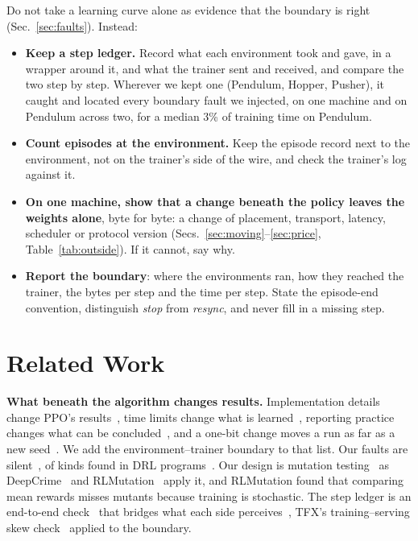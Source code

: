\documentclass[conference]{IEEEtran}
\begin{document}
Do not take a learning curve alone as evidence that the boundary is right
(Sec.~\ref{sec:faults}). Instead:
\begin{itemize}
\item \textbf{Keep a step ledger.} Record what each environment took and
  gave, in a wrapper around it, and what the trainer sent and received, and
  compare the two step by step. Wherever we kept one (Pendulum, Hopper,
  Pusher), it caught and located every boundary fault we injected, on one
  machine and on Pendulum across two, for a median 3\% of training time on
  Pendulum.
\item \textbf{Count episodes at the environment.} Keep the episode record
  next to the environment, not on the trainer's side of the wire, and check
  the trainer's log against it.
\item \textbf{On one machine, show that a change beneath the policy leaves
  the weights alone}, byte for byte: a change of placement, transport,
  latency, scheduler or protocol version
  (Secs.~\ref{sec:moving}--\ref{sec:price}, Table~\ref{tab:outside}). If it
  cannot, say why.
\item \textbf{Report the boundary}: where the environments ran, how they
  reached the trainer, the bytes per step and the time per step. State the
  episode-end convention, distinguish \emph{stop} from \emph{resync}, and
  never fill in a missing step.
\end{itemize}

\section{Related Work}

\textbf{What beneath the algorithm changes results.} Implementation details
change PPO's results~\cite{engstrom2020implementation,huang2022details},
time limits change what is learned~\cite{pardo2018time}, reporting
practice changes what can be
concluded~\cite{henderson2018matters,agarwal2021precipice}, and a one-bit
change moves a run as far as a new seed~\cite{summers2021nondeterminism}.
We add the environment--trainer boundary to that list. Our faults are
silent~\cite{tambon2024silent}, of kinds found in DRL
programs~\cite{nikanjam2022faults}. Our design is mutation
testing~\cite{demillo1978hints} as DeepCrime~\cite{humbatova2021deepcrime}
and RLMutation~\cite{tambon2023rlmutation} apply it, and RLMutation found
that comparing mean rewards misses mutants because training is stochastic.
The step ledger is an end-to-end check~\cite{saltzer1984endtoend} that bridges
what each side perceives~\cite{huang2017gray}, TFX's training--serving
skew check~\cite{breck2019datavalidation} applied to the boundary.
\end{document}
